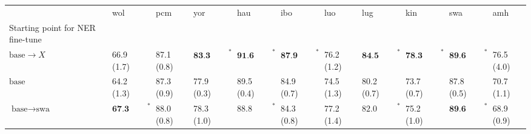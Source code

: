 \begin{tabular}{lllllllllll}
\toprule
{} &                      wol &         pcm &                      yor &                      hau &                      ibo &         luo &                      lug &                      kin &                      swa &         amh \\
Starting point for NER fine-tune &                          &             &                          &                          &                          &             &                          &                          &                          &             \\
\midrule
$\text{base} \to X$              &               66.9 (1.7) &  87.1 (0.8) &  $\textbf{83.3 (0.3)}^*$ &  $\textbf{91.6 (0.4)}^*$ &  $\textbf{87.9 (0.5)}^*$ &  76.2 (1.2) &  $\textbf{84.5 (0.5)}^*$ &  $\textbf{78.3 (1.0)}^*$ &  $\textbf{89.6 (0.6)}^*$ &  76.5 (4.0) \\
$\text{base}$                    &               64.2 (1.3) &  87.3 (0.9) &               77.9 (0.3) &               89.5 (0.4) &               84.9 (0.7) &  74.5 (1.3) &               80.2 (0.7) &               73.7 (0.7) &               87.8 (0.5) &  70.7 (1.1) \\
$\text{base} \to \text{swa}$     &  $\textbf{67.3 (1.3)}^*$ &  88.0 (0.8) &               78.3 (1.0) &    $\text{88.8 (0.2)}^*$ &               84.3 (0.8) &  77.2 (1.4) &    $\text{82.0 (0.5)}^*$ &               75.2 (1.0) &  $\textbf{89.6 (0.6)}^*$ &  68.9 (0.9) \\
\bottomrule
\end{tabular}
